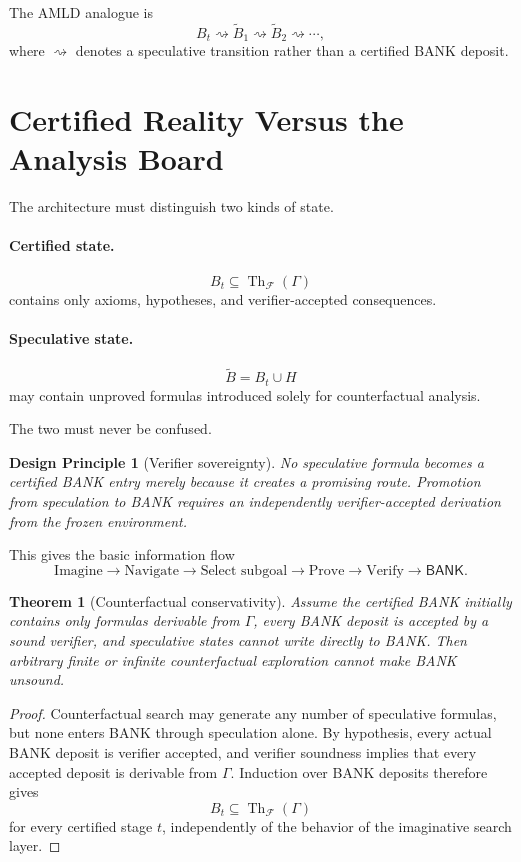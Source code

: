 \documentclass[11pt]{article}
\newtheorem{theorem}[definition]{Theorem}
\newtheorem{principle}[definition]{Design Principle}
\newcommand{\BANK}{\ensuremath{\mathsf{BANK}}}
\newcommand{\Th}{\operatorname{Th}}
\begin{document}
The AMLD analogue is
\[
B_t
\rightsquigarrow
\widetilde B_1
\rightsquigarrow
\widetilde B_2
\rightsquigarrow
\cdots,
\]
where $\rightsquigarrow$ denotes a speculative transition rather than a certified BANK deposit.

\section{Certified Reality Versus the Analysis Board}

The architecture must distinguish two kinds of state.

\paragraph{Certified state.}
\[
B_t\subseteq \Th_{\mathcal F}(\Gamma)
\]
contains only axioms, hypotheses, and verifier-accepted consequences.

\paragraph{Speculative state.}
\[
\widetilde B=B_t\cup H
\]
may contain unproved formulas introduced solely for counterfactual analysis.

The two must never be confused.

\begin{principle}[Verifier sovereignty]
No speculative formula becomes a certified BANK entry merely because it creates a promising route. Promotion from speculation to BANK requires an independently verifier-accepted derivation from the frozen environment.
\end{principle}

This gives the basic information flow
\[
\boxed{
\text{Imagine}
\longrightarrow
\text{Navigate}
\longrightarrow
\text{Select subgoal}
\longrightarrow
\text{Prove}
\longrightarrow
\text{Verify}
\longrightarrow
\BANK.
}
\]

\begin{theorem}[Counterfactual conservativity]
Assume the certified BANK initially contains only formulas derivable from $\Gamma$, every BANK deposit is accepted by a sound verifier, and speculative states cannot write directly to BANK. Then arbitrary finite or infinite counterfactual exploration cannot make BANK unsound.
\end{theorem}

\begin{proof}
Counterfactual search may generate any number of speculative formulas, but none enters BANK through speculation alone. By hypothesis, every actual BANK deposit is verifier accepted, and verifier soundness implies that every accepted deposit is derivable from $\Gamma$. Induction over BANK deposits therefore gives
\[
B_t\subseteq\Th_{\mathcal F}(\Gamma)
\]
for every certified stage $t$, independently of the behavior of the imaginative search layer.
\end{proof}
\end{document}
